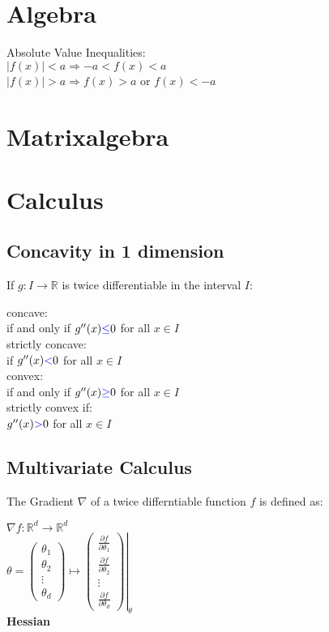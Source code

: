 \section{Algebra}
Absolute Value Inequalities:\\
$ |f(x)| < a  \Rightarrow  -a < f(x) < a$\\ 
$|f(x)| > a  \Rightarrow f(x) > a$ or $f(x) < -a$\\
\section{Matrixalgebra}
\section{Calculus}
\subsection*{Concavity in 1 dimension}
If $g:I \to \mathbb {R}$ is twice differentiable in the interval $I$:

concave:\\ 
if and only if $g^{\prime \prime }(x) {\color{blue}{\leq }}  0$ for all $x \in I$\\

strictly concave:\\
if $g^{\prime \prime }(x) {\color{blue}{<}}  0$ for all $x \in I$\\

convex:\\ 
if and only if $g^{\prime \prime }(x) {\color{blue}{\geq }}  0$ for all $x \in I$\\

strictly convex if:\\
$g^{\prime \prime }(x) {\color{blue}{>}}  0$ for all $x \in I$\\

\subsection*{Multivariate Calculus}
The Gradient $\nabla$ of a twice differntiable function $f$ is defined as:

$\nabla f:\mathbb {R}^ d \rightarrow \mathbb {R}^ d $\\
$\displaystyle \theta =\begin{pmatrix} \theta _1\\ \theta _2\\ \vdots \\ \theta _ d\end{pmatrix} \displaystyle \mapsto \displaystyle \left.\begin{pmatrix}  \frac{\partial f }{\partial \theta _1}\\ \frac{\partial f }{\partial \theta _2}\\ \vdots \\ \frac{\partial f }{\partial \theta _ d}\end{pmatrix}\right|_{\theta }$\\
\textbf{Hessian}\\

